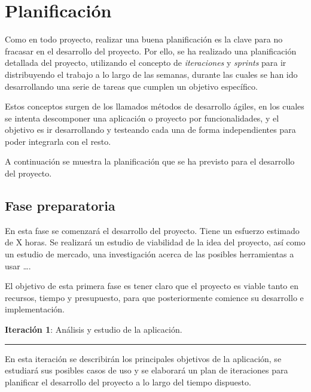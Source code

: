


\pagestyle{miEstilo2}

\section{Planificación}

Como en todo proyecto, realizar una buena planificación es la clave para no fracasar en el desarrollo del proyecto. Por ello, se ha realizado una planificación detallada del proyecto, utilizando el concepto de \textit{iteraciones} y \textit{sprints} para ir distribuyendo el trabajo a lo largo de las semanas, durante las cuales se han ido desarrollando una serie de tareas que cumplen un objetivo específico.

Estos conceptos surgen de los llamados métodos de desarrollo ágiles, en los cuales se intenta descomponer una aplicación o proyecto por funcionalidades, y el objetivo es ir desarrollando y testeando cada una de forma independientes para poder integrarla con el resto.

A continuación se muestra la planificación que se ha previsto para el desarrollo del proyecto.


\subsection{Fase preparatoria}

En esta fase se comenzará el desarrollo del proyecto. Tiene un esfuerzo estimado de X horas. Se realizará un estudio de viabilidad de la idea del proyecto, así como un estudio de mercado, una investigación acerca de las posibles herramientas a usar \ldots.

El objetivo de esta primera fase es tener claro que el proyecto es viable tanto en recursos, tiempo y presupuesto, para que posteriormente comience su desarrollo e implementación.

\large{\textbf{Iteración 1}: Análisis y estudio de la aplicación.}
\hrule

\vspace{0.3cm}

\normalsize

En esta iteración se describirán los principales objetivos de la aplicación, se estudiará sus posibles casos de uso y se elaborará un plan de iteraciones para planificar el desarrollo del proyecto a lo largo del tiempo dispuesto.

